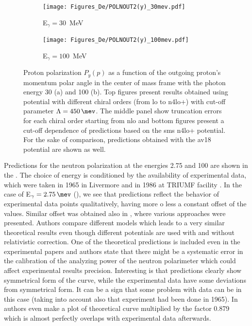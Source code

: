     \begin{figure}[h]
        \centering
        \begin{subfigure}[b]{0.46\textwidth}
            \caption{\small E$_\gamma = 30$~MeV}
            \texttt{[image: Figures\_De/POLNOUT2(y)\_30mev.pdf]}
            \label{PY_30_vert}
        \end{subfigure}
        \begin{subfigure}[b]{0.46\textwidth}
            \caption{\small E$_\gamma = 100$~MeV}
            \texttt{[image: Figures\_De/POLNOUT2(y)\_100mev.pdf]}
            \label{PY_100_vert}
        \end{subfigure}
        \caption{Proton polarization $P_y(p)$ 
        \label{PY_30_100_vert}
        as a function of the outgoing proton's momentum polar angle in the center of mass frame 
        with the photon energy \SI{30}{\mev} (a) and \SI{100}{\mev} (b).
        Top figures present results obtained using potential
        with different chiral orders (from \gls{lo} to \gls{n4lo+}) with cut-off parameter $\Lambda=\SI{450}{\mev}$.
        The middle panel show truncation errors for each 
        chiral order starting from \gls{nlo} and
        bottom figures present a cut-off dependence of predictions
        based on the \gls{sms} \gls{n4lo+} potential.
        For the sake of comparison, predictions obtained with the \gls*{av18} potential 
        are shown as well.}
    \end{figure}



    Predictions for the neutron polarization at the energies \SI{2.75}{\mev} and \SI{100}{\mev} are shown in the
    . The choice of energy is conditioned by the availability of experimental data,
    which were taken in 1965 in Livermore \cite{Jewell_neuteronpolarization} and 
    in 1986 at TRIUMF facility \cite{CAMERON_neuteronpolarization}.
    In the case of E$_\gamma = \SI{2.75}{\mev}$ (), we see that predictions reflect
    the behavior of experimental data points qualitatively,
    having more o less a constant offset of the values. Similar offset was obtained
    also in \cite{ArenhovelPhotodisint1991}, where various approaches  were presented.
    Authors compare different models which leads to a very similar theoretical results
    even though different potentials are used with and without relativistic correction.
    One of the theoretical predictions is included even in the experimental papers
    \cite{Jewell_neuteronpolarization} and authors state that there might be a
    systematic error in the calibration of the analyzing power
    of the neutron polarimeter which could affect experimental results precision.
    Interesting is that predictions clearly show symmetrical form of the curve, while the experimental data
    have some deviations from symmetrical form. It can be a sign that some problem with data can be
    in this case (taking into account also that experiment had been done in 1965).
    In \cite{Jewell_neuteronpolarization} authors even make a plot of theoretical curve
    multiplied by the factor 0.879 which is almost perfectly overlaps with experimental data afterwards. 

